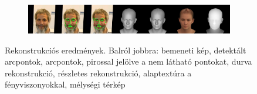\documentclass[12pt,a4]{article}
\begin{document}
\begin{figure}[htb]
                \begin{subfigure}[b]{1\textwidth}
                   \includegraphics[width=1\linewidth]{test0030_vis.jpg}
                \end{subfigure}
                
                \caption{Rekonstrukciós eredmények. Balról jobbra: bemeneti kép, detektált arcpontok, arcpontok, pirossal jelölve a nem látható pontokat, durva rekonstrukció, részletes rekonstrukció, alaptextúra a fényviszonyokkal, mélységi térkép}
                \label{fig:our-reconstruction-results2}
            \end{figure}
\end{document}
